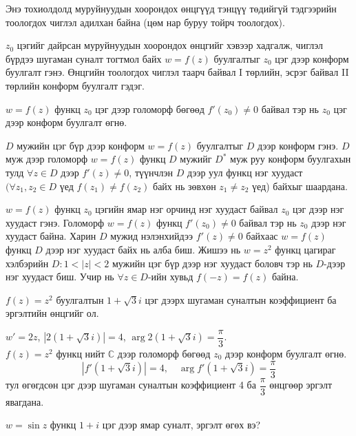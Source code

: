 \begin{hnt}
Энэ тохиолдолд муруйнуудын хоорондох өнцгүүд тэнцүү төдийгүй тэдгээрийн тоологдох чиглэл адилхан байна (цөм нар буруу тойрч тоологдох).
\end{hnt}
\begin{dfn}
$z_0$ цэгийг дайрсан муруйнуудын хоорондох өнцгийг хэвээр хадгалж, чиглэл бүрдээ шугаман суналт тогтмол байх $w=f(z)$ буулгалтыг $z_0$ цэг дээр конформ буулгалт  гэнэ. Өнцгийн тоологдох чиглэл таарч байвал I төрлийн,  эсрэг байвал II төрлийн конформ буулгалт  гэдэг. 
\end{dfn}
\begin{thm}
$w=f(z)$ функц $z_0$ цэг дээр голоморф бөгөөд $f'(z_0)\neq 0$ байвал тэр нь $z_0$ цэг дээр конформ буулгалт өгнө.

$D$ мужийн цэг бүр дээр конформ $w=f(z)$ буулгалтыг $D$ дээр конформ гэнэ. $D$ муж дээр голоморф $w=f(z)$ функц $D$ мужийг $D^*$ муж руу конформ буулгахын тулд $\forall z\in D$ дээр $f'(z)\neq 0$, түүнчлэн $D$ дээр уул функц нэг хуудаст $(\forall z_1,z_2\in D$ үед $f(z_1)\neq f(z_2)$ байх нь зөвхөн $z_1\neq z_2$ үед) байхыг шаардана.
\end{thm}
\begin{hnt}
$w=f(z)$ функц $z_0$ цэгийн ямар нэг орчинд нэг хуудаст байвал $z_0$ цэг дээр нэг хуудаст гэнэ. Голоморф $w=f(z)$ функц $f'(z_0)\neq 0$ байвал тэр нь $z_0$ дээр нэг хуудаст байна. Харин $D$ мужид нэлэнхийдээ $f'(z)\neq 0$ байхаас $w=f(z)$ функц $D$ дээр нэг хуудаст байх нь алба биш. Жишээ нь $w=z^2$ функц цагираг хэлбэрийн $D:1<|z|<2$ мужийн цэг бүр дээр нэг хуудаст боловч тэр нь $D$-дээр нэг хуудаст биш. Учир нь $\forall z\in D$-ийн хувьд $f(-z)=f(z)$ байна. 
\end{hnt}
\begin{exm}
$f(z)=z^2$ буулгалтын $1+\sqrt{3}i$ цэг дээрх шугаман суналтын коэффициент ба эргэлтийн өнцгийг ол.
\end{exm}
\begin{sol}
$w'=2z$, $|2(1+\sqrt{3}i)|=4$, $\arg  2(1+\sqrt{3}i)=\dfrac{\pi}{3}.$\\ $f(z)=z^2$ функц нийт $\mathbb{C}$ дээр голоморф бөгөөд $z_0$ дээр конформ буулгалт өгнө.
$$|f'(1+\sqrt{3}i)|=4, \quad \arg  f'(1+\sqrt{3}i)=\frac{\pi}{3}$$ тул өгөгдсөн цэг дээр шугаман суналтын коэффициент 4 ба $\dfrac{\pi}{3}$ өнцгөөр эргэлт явагдана.
\end{sol}
\begin{exm}
$w=\sin z$ функц $1+i$ цэг дээр ямар суналт, эргэлт өгөх вэ?
\end{exm}
